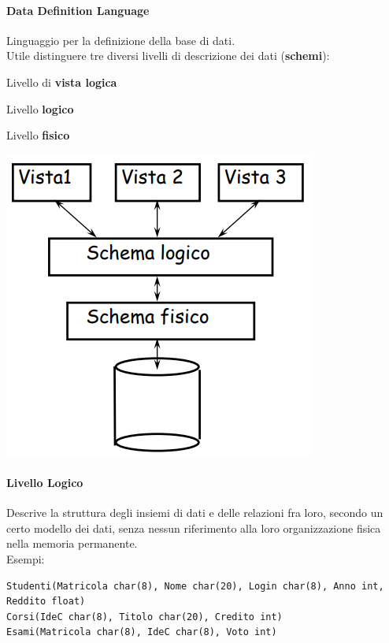 \documentclass[10pt]{book}
\begin{document}
\paragraph{Data Definition Language} Linguaggio per la definizione della base di dati.\\
Utile distinguere tre diversi livelli di descrizione dei dati (\textbf{schemi}):
\begin{multicols}{2}
\begin{list}{}{}
	\item Livello di \textbf{vista logica}
	\item Livello \textbf{logico}
	\item Livello \textbf{fisico}
\end{list}
\begin{center}
	\includegraphics[scale=0.5]{livellidescrdati.png}
\end{center}
\end{multicols}
\paragraph{Livello Logico} Descrive la struttura degli insiemi di dati e delle relazioni fra loro, secondo un certo modello dei dati, senza nessun riferimento alla loro organizzazione fisica nella memoria permanente.\\
Esempi:
\begin{lstlisting}
Studenti(Matricola char(8), Nome char(20), Login char(8), Anno int, Reddito float)
Corsi(IdeC char(8), Titolo char(20), Credito int)
Esami(Matricola char(8), IdeC char(8), Voto int)
\end{lstlisting}
\end{document}
